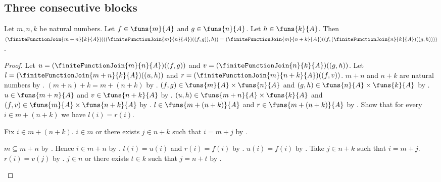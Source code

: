 \subsection{Three consecutive blocks}

\begin{theorem}\label{finite_function_join_associative}
    Let $m,n,k$ be natural numbers.
    Let $f\in\funs{m}{A}$ and $g\in\funs{n}{A}$.
    Let $h\in\funs{k}{A}$.
    Then $(\finiteFunctionJoin{m+n}{k}{A})(((\finiteFunctionJoin{m}{n}{A})((f,g)),h))
        =(\finiteFunctionJoin{m}{n+k}{A})((f,(\finiteFunctionJoin{n}{k}{A})((g,h))))$.
\end{theorem}
\begin{proof}
    Let $u=(\finiteFunctionJoin{m}{n}{A})((f,g))$ and
        $v=(\finiteFunctionJoin{n}{k}{A})((g,h))$.
    Let $l=(\finiteFunctionJoin{m+n}{k}{A})((u,h))$ and
        $r=(\finiteFunctionJoin{m}{n+k}{A})((f,v))$.
    $m+n$ and $n+k$ are natural numbers by .
    $(m+n)+k=m+(n+k)$ by .
    $(f,g)\in\funs{m}{A}\times\funs{n}{A}$ and
        $(g,h)\in\funs{n}{A}\times\funs{k}{A}$ by .
    $u\in\funs{m+n}{A}$ and $v\in\funs{n+k}{A}$ by
        .
    $(u,h)\in\funs{m+n}{A}\times\funs{k}{A}$ and
        $(f,v)\in\funs{m}{A}\times\funs{n+k}{A}$ by .
    $l\in\funs{m+(n+k)}{A}$ and $r\in\funs{m+(n+k)}{A}$ by
        .
    Show that for every $i\in m+(n+k)$ we have $l(i)=r(i)$.
    \begin{subproof}
        Fix $i\in m+(n+k)$.
        $i\in m$ or there exists $j\in n+k$ such that $i=m+j$ by
            .
        \begin{byCase}
                $m\subseteq m+n$ by .
                Hence $i\in m+n$ by .
                $l(i)=u(i)$ and $r(i)=f(i)$ by
                    .
                $u(i)=f(i)$ by .
                Take $j\in n+k$ such that $i=m+j$.
                $r(i)=v(j)$ by .
                $j\in n$ or there exists $t\in k$ such that $j=n+t$ by
                    .

\end{byCase}
\end{subproof}
\end{proof}
